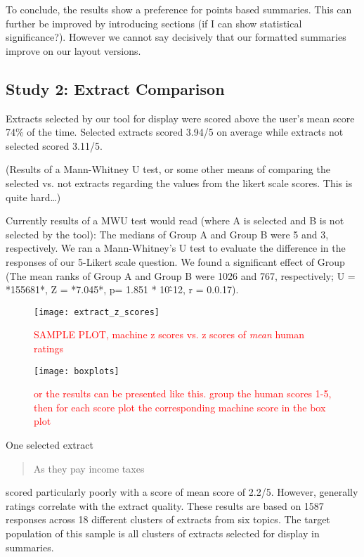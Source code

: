       To conclude, the results show a preference for points based summaries. This can further be improved by introducing sections (if I can show statistical significance?). However we cannot say decisively that our formatted summaries improve on our layout versions.

    \tocless\subsection{Study 2: Extract Comparison}
      Extracts selected by our tool for display were scored above the user's mean score 74\% of the time. Selected extracts scored 3.94/5 on average while extracts not selected scored 3.11/5.

      (Results of a Mann-Whitney U test, or some other means of comparing the selected vs. not extracts regarding the values from the likert scale scores. This is quite hard\dots)

      Currently results of a MWU test would read (where A is selected and B is not selected by the tool): The medians of Group A and Group B were 5 and 3, respectively. We ran a Mann-Whitney's U test to evaluate the difference in the responses of our 5-Likert scale question. We found a significant effect of Group (The mean ranks of Group A and Group B were 1026 and 767, respectively; U = *155681*, Z = *7.045*, p= 1.851 * 10\^-12, r = 0.0.17).

      \begin{figure}[h]
        \caption{\textcolor{red}{SAMPLE PLOT, machine z scores vs. z scores of \textit{mean} human ratings}}
        \centering
        \texttt{[image: extract\_z\_scores]}
      \end{figure}

      \begin{figure}[h]
        \caption{\textcolor{red}{or the results can be presented like this. group the human scores 1-5, then for each score plot the corresponding machine score in the box plot}}
        \centering
        \texttt{[image: boxplots]}
      \end{figure}

      One selected extract \blockquote{As they pay income taxes} scored particularly poorly with a score of mean score of 2.2/5. However, generally ratings correlate with the extract quality. These results are based on 1587 responses across 18 different clusters of extracts from six topics. The target population of this sample is all clusters of extracts selected for display in summaries.

